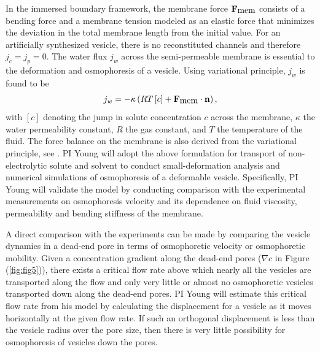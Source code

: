 \documentclass[11pt]{article}
\begin{document}
 In the immersed boundary framework, the
membrane force ${\bf F}_{\mbox{mem}}$ consists of a bending force and a membrane tension modeled as an elastic force that minimizes the deviation in the total membrane
length from the initial value.
%
For an artificially synthesized vesicle, there is no reconstituted channels and therefore $j_c=j_p=0$.
The water flux $j_w$ across the semi-permeable membrane is essential to the deformation and osmophoresis of a vesicle. 
Using variational principle, $j_w$ is found to be
\begin{equation}
\label{eq:jw}
 j_w =-\kappa\left(RT\left[c\right] + {\bf F}_{\mbox{mem}}\cdot{\bf n}\right),
\end{equation}
with $[c]$ denoting the jump in solute concentration $c$ across the membrane, 
$\kappa$ the water permeability constant, $R$ the gas constant, and $T$ the temperature of the fluid. 
The force balance on the membrane is also derived from the variational principle, see \cite{YaoMori2017_JCP}. 
PI Young will adopt the above
formulation for transport of non-electrolytic solute and solvent to conduct small-deformation analysis and numerical simulations of osmophoresis of a
deformable vesicle.
Specifically, PI Young will validate the model by conducting comparison with the experimental measurements on osmophoresis 
velocity and its dependence on fluid viscosity, permeability and bending stiffness of the membrane. 


A direct comparison with the experiments can be made by comparing the vesicle dynamics in a dead-end pore in terms of osmophoretic velocity or osmophoretic mobility.
Given a concentration gradient along the dead-end pores ($\nabla c$ in Figure (\ref{fig:fig5})), there exists a critical flow rate above which
nearly all the vesicles are transported along the flow and only very little or almost no osmophoretic vesicles transported down along the dead-end pores.
PI Young will estimate this critical flow rate from his model by calculating the displacement for a vesicle as it moves horizontally at the given flow rate. 
If such an orthogonal displacement is less than the vesicle radius over the pore size, then there is very little possibility for osmophoresis of vesicles down
the pores.
\end{document}
